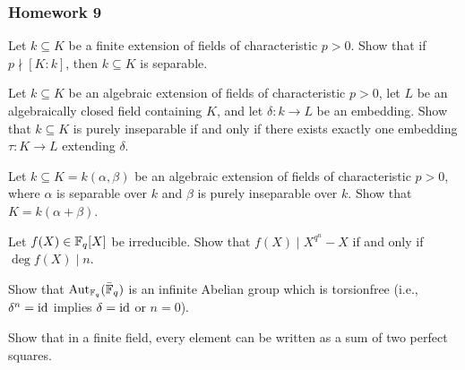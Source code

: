 \subsubsection{Homework 9}
\setcounter{exercise}{0}
\setcounter{equation}{0}

\begin{problem}
  Let $k\subseteq K$ be a finite extension of fields of characteristic
  $p>0$. Show that if $p\nmid[K:k]$, then $k\subseteq K$ is separable.
\end{problem}
\begin{solution}
\end{solution}

\begin{problem}
  Let $k\subseteq K$ be an algebraic extension of fields of characteristic
  $p>0$, let $L$ be an algebraically closed field containing $K$, and let
  $\delta\colon k\to L$ be an embedding. Show that $k\subseteq K$ is purely
  inseparable if and only if there exists exactly one embedding
  $\tau\colon K\to L$ extending $\delta$.
\end{problem}
\begin{solution}
\end{solution}

\begin{problem}
  Let $k\subseteq K=k(\alpha,\beta)$ be an algebraic extension of fields of
  characteristic $p>0$, where $\alpha$ is separable over $k$ and $\beta$ is
  purely inseparable over $k$. Show that $K=k(\alpha+\beta)$.
\end{problem}
\begin{solution}
\end{solution}

\begin{problem}
  Let $f(X)\in\mathbb{F}_q[X]$ be irreducible. Show that $f(X)\mid X^{q^n}-X$ if
  and only if $\deg f(X)\mid n$.
\end{problem}
\begin{solution}
\end{solution}

\begin{problem}
  Show that $\operatorname{Aut}_{\mathbb{F}_q}(\bar{\mathbb{F}}_q)$ is an infinite Abelian group which
  is torsionfree (i.e., $\delta^n=\operatorname{id}$ implies $\delta=\operatorname{id}$ or $n=0$).
\end{problem}
\begin{solution}
\end{solution}

\begin{problem}
  Show that in a finite field, every element can be written as a sum of two
  perfect squares.
\end{problem}
\begin{solution}
\end{solution}

